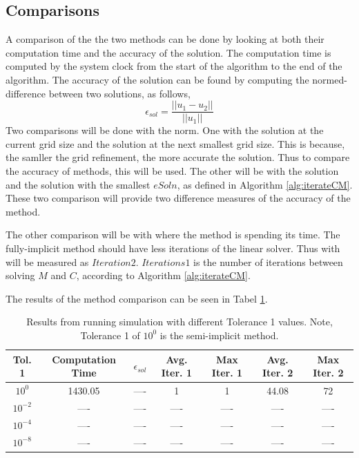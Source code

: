 \documentclass{llncs}
\begin{document}
  \subsection{Comparisons}
    A comparison of the the two methods can be done by looking at both their computation time and the accuracy of the solution.
    The computation time is computed by the system clock from the start of the algorithm to the end of the algorithm. 
    The accuracy of the solution can be found by computing the normed-difference between two solutions, as follows,
    \begin{equation}
      \epsilon_{sol} = \frac{||u_1 - u_2||}{||u_1||}
    \end{equation}
    Two comparisons will be done with the norm. 
    One with the solution at the current grid size and the solution at the next smallest grid size.
    This is because, the samller the grid refinement, the more accurate the solution. 
    Thus to compare the accuracy of methods, this will be used.
    The other will be with the solution and the solution with the smallest $eSoln$, as defined in Algorithm \ref{alg:iterateCM}.
    These two comparison will provide two difference measures of the accuracy of the method.

    The other comparison will be with where the method is spending its time.
    The fully-implicit method should have less iterations of the linear solver.
    Thus with will be measured as $Iteration 2$. 
    $Iterations 1$ is the number of iterations between solving $M$ and $C$, according to Algorithm \ref{alg:iterateCM}.
    
    The results of the method comparison can be seen in Tabel \ref{tab:tolerance_comparison}.
    
    \begin{table}[h!tb]
      \begin{center}
      \begin{tabular}{|c|c|c|c|c|c|c|}
        \hline
        Tol. 1 & Computation Time & $\epsilon_{sol}$ & Avg. Iter. 1 & Max Iter. 1 & Avg. Iter. 2 & Max Iter. 2 \\
        \hline
        $10^{0}$ & 1430.05 & ---- & 1 & 1 & 44.08 & 72 \\
        $10^{-2}$ & ---- & ---- & ---- & ---- & ---- & ---- \\
        $10^{-4}$ & ---- & ---- & ---- & ---- & ---- & ---- \\
        $10^{-8}$ & ---- & ---- & ---- & ---- & ---- & ---- \\
        \hline
      \end{tabular}
      \caption{Results from running simulation with different Tolerance 1 values. Note, Tolerance 1 of $10^{0}$ is the semi-implicit method.}
      \label{tab:tolerance_comparison}
      \end{center}
    \end{table}
\end{document}
